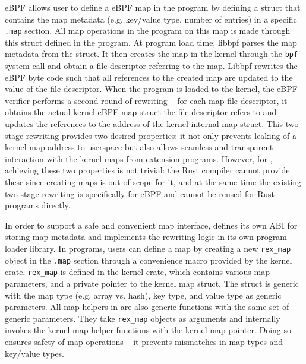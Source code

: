 eBPF allows user to define a eBPF map in the program by defining a struct that
    contains the map metadata (e.g. key/value type, number of entries) in a
    specific \texttt{.map} section.
All map operations in the program on this map is made through this struct
    defined in the program.
At program load time, libbpf parses the map metadata from the struct.
It then creates the map in the kernel through the \texttt{bpf} system call and
    obtain a file descriptor referring to the map.
Libbpf rewrites the eBPF byte code such that all references to the created map
    are updated to the value of the file descriptor.
When the program is loaded to the kernel, the eBPF verifier performs a second
    round of rewriting -- for each map file descriptor, it obtains the actual
    kernel eBPF map struct the file descriptor refers to and updates the
    references to the address of the kernel internal map struct.
This two-stage rewriting provides two desired properties: it not only prevents
    leaking of a kernel map address to userspace but also allows seamless and
    transparent interaction with the kernel maps from extension programs.
However, for \projname{}, achieving these two properties is not trivial: the
    Rust compiler cannot provide these since creating maps is out-of-scope for
    it, and at the same time the existing two-stage rewriting is specifically
    for eBPF and cannot be reused for Rust programs directly.

In order to support a safe and convenient map interface, \projname{} defines
    its own ABI for storing map metadata and implements the rewriting logic in
    its own program loader library.
In \projname{} programs, users can define a map by creating a new
    \texttt{rex\_map} object in the \texttt{.map} section through a convenience
    macro provided by the \projname{} kernel crate.
\texttt{rex\_map} is defined in the \projname{} kernel crate, which contains
    various map parameters, and a private pointer to the kernel map struct.
The struct is generic with the map type (e.g. array vs. hash), key type, and
    value type as generic parameters.
All map helpers in \projname{} are also generic functions with the same set of
    generic parameters.
They take \texttt{rex\_map} objects as arguments and internally invokes the
    kernel map helper functions with the kernel map pointer.
Doing so ensures safety of map operations -- it prevents mismatches in map
    types and key/value types.

